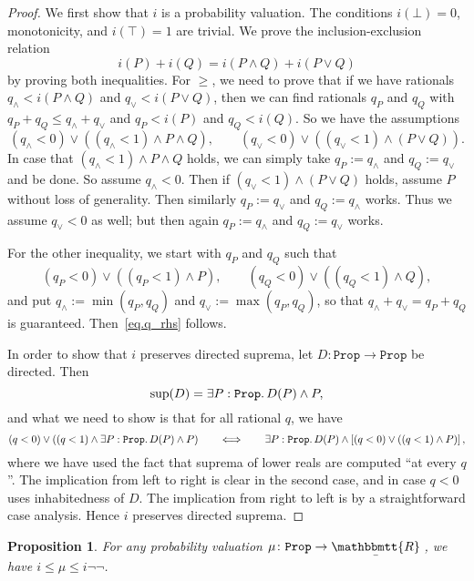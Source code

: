\documentclass[11pt, oneside, article]{memoir}
\theoremstyle{plain}
\newtheorem{proposition}[theorem]{Proposition}
\theoremstyle{definition}
\theoremstyle{remark}
\newcommand{\const}[1]{\mathtt{#1}}
\newcommand{\ubar}[1]{\underaccent{\bar}{#1}}
\newcommand{\internal}[1]{\raisebox{-.03ex}{$\mathbbmtt{#1}$}}
\newcommand{\hs}{\hspace{1.1pt}}
\newcommand{\tRR}{\internal{R}\hs}
\newcommand{\tLR}{\ubar{\tRR}\hs}
\newcommand{\Prop}{\const{Prop}}
\begin{document}
\begin{proof}
We first show that $i$ is a probability valuation. The conditions $i(\bot) = 0$, monotonicity, and $i(\top) = 1$ are trivial. We prove the inclusion-exclusion relation
\[
	i(P) + i(Q) = i(P \land Q) + i(P \lor Q)
\]
by proving both inequalities. For $\geq$, we need to prove that if we have rationals $q_\land < i(P \land Q)$ and $q_\lor < i(P \lor Q)$, then we can find rationals $q_P$ and $q_Q$ with $q_P + q_Q \leq q_\land + q_\lor$ and $q_P < i(P)$ and $q_Q < i(Q)$. So we have the assumptions
\begin{equation}
	\label{eq.q_rhs}
	(q_\land < 0) \lor ( (q_\land < 1) \land P \land Q), \qquad (q_\lor < 0) \lor ( (q_\lor < 1) \land (P \lor Q)).
\end{equation}
In case that $(q_\land < 1) \land P \land Q$ holds, we can simply take $q_P := q_\land$ and $q_Q := q_\lor$ and be done. So assume $q_\land < 0$. Then if $(q_\lor < 1) \land (P \lor Q)$ holds, assume $P$ without loss of generality. Then similarly $q_P := q_\lor$ and $q_Q := q_\land$ works. Thus we assume $q_\lor < 0$ as well; but then again $q_P := q_\land$ and $q_Q := q_\lor$ works.

For the other inequality, we start with $q_P$ and $q_Q$ such that
\[
	(q_P < 0) \lor ( (q_P < 1) \land P), \qquad (q_Q < 0) \lor ( (q_Q < 1) \land Q),
\]
and put $q_\land := \min(q_P, q_Q)$ and $q_\lor := \max(q_P, q_Q)$, so that $q_\land + q_\lor = q_P + q_Q$ is guaranteed. Then~\eqref{eq.q_rhs} follows.

In order to show that $i$ preserves directed suprema, let $D : \Prop \to \Prop$ be directed. Then
\[
	\sup(D) = \exists P : \Prop \ldotp D(P) \land P,
\]
and what we need to show is that for all rational $q$, we have
\[
	(q < 0) \lor ( (q < 1) \land \exists P : \Prop \ldotp D(P) \land P) \qquad \Longleftrightarrow \qquad \exists P : \Prop \ldotp D(P) \land \left[ (q < 0) \lor ( (q < 1) \land P ) \right],
\]
where we have used the fact that suprema of lower reals are computed ``at every $q$''. The implication from left to right is clear in the second case, and in case $q < 0$ uses inhabitedness of $D$. The implication from right to left is by a straightforward case analysis. Hence $i$ preserves directed suprema.
\end{proof}

\begin{proposition}
\label{prop.sandwich}
For any probability valuation $\mu\colon\Prop\to\tLR$, we have $i\leq\mu\leq i\neg\neg$.
\end{proposition}
\end{document}
